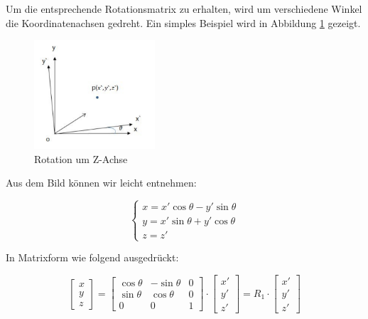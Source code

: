 Um die entsprechende Rotationsmatrix zu erhalten, wird um verschiedene Winkel die Koordinatenachsen gedreht. Ein simples Beispiel wird in Abbildung \ref{fig:rotation} gezeigt.

\begin{figure}[H]
 \centering 
 \includegraphics[keepaspectratio,width=0.4\textwidth]{images/3_Ersteverfahren/Kamera/rotationsmatrix.pdf}
 \caption{Rotation um Z-Achse}
 \label{fig:rotation}
\end{figure} 

Aus dem Bild können wir leicht entnehmen:

\begin{equation}
   \begin{cases} 
	x = x'\cos\theta - y'\sin\theta \\	
	y = x'\sin\theta + y'\cos\theta \\
	z = z'
	\end{cases}
\end{equation}

In Matrixform wie folgend ausgedrückt:

\begin{equation}
   \begin{bmatrix}
	x \\  
	y \\
	z
	\end{bmatrix} = \begin{bmatrix}
	\cos\theta & -\sin\theta & 0	\\
	\sin\theta & \cos\theta  & 0	\\
	0    	   & 0           & 1	
	\end{bmatrix} \cdot \begin{bmatrix}
	x' \\  
	y' \\
	z'
	\end{bmatrix}= R_1 \cdot \begin{bmatrix}
	x' \\  
	y' \\
	z'
	\end{bmatrix}
\end{equation}

